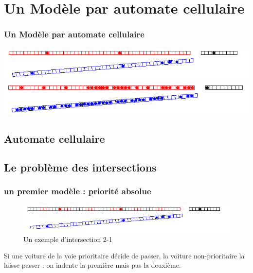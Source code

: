 \documentclass[slidetop,11pt]{beamer}
\begin{document}
\section{Un Modèle par automate cellulaire}
	\begin{frame}
		\frametitle{Un Modèle par automate cellulaire}
		\begin{center}
			\includegraphics[scale=0.42]{./images/localdebut}\vfill
			\includegraphics[scale=0.42]{./images/localsature}
		\end{center}
	\end{frame}

	\subsection{Automate cellulaire}


	\subsection{Le problème des intersections}

\begin{frame}
	\frametitle{un premier modèle : priorité absolue}
	\begin{figure}
		\begin{center}
			\includegraphics[scale=0.5]{./images/localdebut}
		\end{center}
		\caption{Un exemple d'intersection 2-1}
	\end{figure}
	
	Si une voiture de la voie prioritaire décide de passer, la voiture non-prioritaire la laisse passer : on indente la première mais pas la deuxième.
\end{frame}	
	
\end{document}
